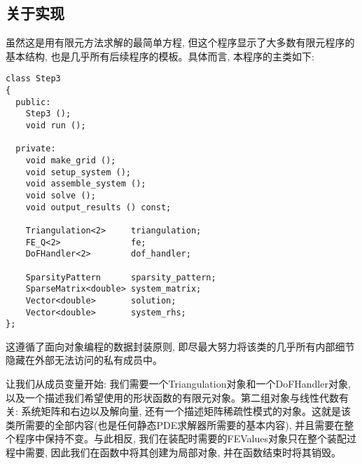 \documentclass[12pt, a4paper, oneside]{ctexart}
\begin{document}
\subsection{关于实现}
虽然这是用有限元方法求解的最简单方程, 但这个程序显示了大多数有限元程序的基本结构, 也是几乎所有后续程序的模板。具体而言, 本程序的主类如下: 
\lstset{language=C++}
\begin{lstlisting}
class Step3
{
  public:
    Step3 ();
    void run ();
 
  private:
    void make_grid ();
    void setup_system ();
    void assemble_system ();
    void solve ();
    void output_results () const;
 
    Triangulation<2>     triangulation;
    FE_Q<2>              fe;
    DoFHandler<2>        dof_handler;
 
    SparsityPattern      sparsity_pattern;
    SparseMatrix<double> system_matrix;
    Vector<double>       solution;
    Vector<double>       system_rhs;
};
\end{lstlisting}
这遵循了面向对象编程的数据封装原则, 即尽最大努力将该类的几乎所有内部细节隐藏在外部无法访问的私有成员中。

让我们从成员变量开始: 我们需要一个Triangulation对象和一个DoFHandler对象, 以及一个描述我们希望使用的形状函数的有限元对象。第二组对象与线性代数有关: 系统矩阵和右边以及解向量,
 还有一个描述矩阵稀疏性模式的对象。这就是该类所需要的全部内容(也是任何静态PDE求解器所需要的基本内容), 并且需要在整个程序中保持不变。与此相反, 我们在装配时需要的FEValues对象只在整个装配过程中需要, 因此我们在函数中将其创建为局部对象, 并在函数结束时将其销毁。
\end{document}
